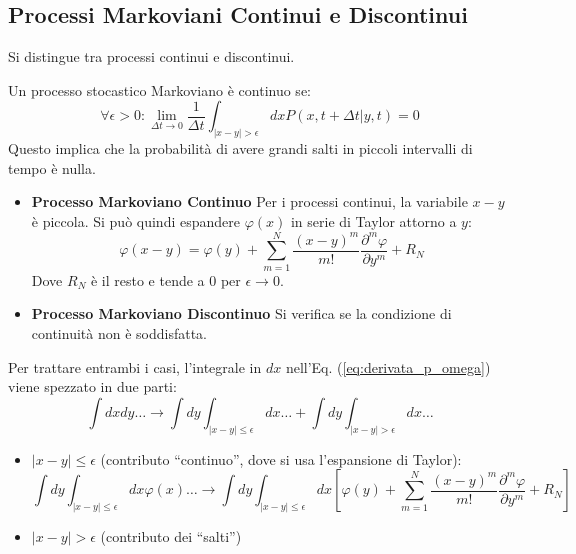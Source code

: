 \subsection{Processi Markoviani Continui e Discontinui}
Si distingue tra processi continui e discontinui.

\begin{tcolorbox}[
    colback=colorA!5,      
    colframe=colorA,       
    title={Definizione},
    fonttitle=\bfseries\sffamily,
    arc=3mm,               
    boxrule=1.2pt,         
    halign title=flush left
]
Un processo stocastico Markoviano è continuo se:
\begin{equation}
\forall \epsilon > 0: \lim_{\Delta t \rightarrow 0} \frac{1}{\Delta t} \int_{|x-y|>\epsilon} dx P(x,t+\Delta t|y,t) = 0
\end{equation}
Questo implica che la probabilità di avere grandi salti in piccoli intervalli di tempo è nulla.
\end{tcolorbox}

\begin{itemize}
    \item \textbf{Processo Markoviano Continuo}
Per i processi continui, la variabile $x-y$ è piccola. Si può quindi espandere $\varphi(x)$ in serie di Taylor attorno a $y$:
\begin{equation}
\varphi(x-y) = \varphi(y) + \sum_{m=1}^{N} \frac{(x-y)^m}{m!} \frac{\partial^m \varphi}{\partial y^m} + R_{N}
\end{equation}
Dove $R_N$ è il resto e tende a 0 per $\epsilon \to 0$.
\item \textbf{Processo Markoviano Discontinuo}
Si verifica se la condizione di continuità non è soddisfatta. 
\end{itemize}


Per trattare entrambi i casi, l'integrale in $dx$ nell'Eq. (\ref{eq:derivata_p_omega}) viene spezzato in due parti:
\begin{equation}
\int  dx dy \dots \rightarrow \int dy \int_{|x-y| \le \epsilon} dx \dots + \int dy \int_{|x-y| > \epsilon} dx \dots
\label{eq:spezzamento_integrali}
\end{equation}

\begin{itemize}
    \item $|x-y| \le \epsilon$ (contributo ``continuo'', dove si usa l'espansione di Taylor):
    \begin{equation*}
    \int  dy \int_{|x-y| \le \epsilon} dx \varphi(x) \dots \to \int  dy \int_{|x-y| \le \epsilon} dx \left[ \varphi(y) + \sum_{m=1}^{N} \frac{(x-y)^m}{m!}  \frac{\partial^m \varphi}{\partial y^m} + R_{N} \right]
    \end{equation*}
    \item $|x-y| > \epsilon$ (contributo dei ``salti'')
\end{itemize}


